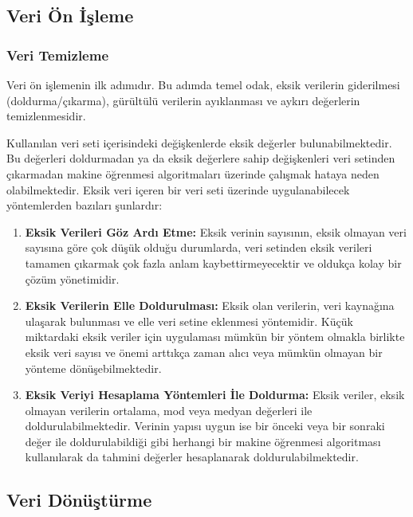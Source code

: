 \documentclass[12pt,twoside]{deuthesis}
\providecommand{\tightlist}{%
  \setlength{\itemsep}{0pt}\setlength{\parskip}{0pt}}
\begin{document}
\hypertarget{veri-uxf6n-iux307ux15fleme}{%
\subsection{Veri Ön İşleme}\label{veri-uxf6n-iux307ux15fleme}}

\hypertarget{veri-temizleme}{%
\subsubsection{Veri Temizleme}\label{veri-temizleme}}

Veri ön işlemenin ilk adımıdır. Bu adımda temel odak, eksik verilerin giderilmesi (doldurma/çıkarma), gürültülü verilerin ayıklanması ve aykırı değerlerin temizlenmesidir.

Kullanılan veri seti içerisindeki değişkenlerde eksik değerler bulunabilmektedir. Bu değerleri doldurmadan ya da eksik değerlere sahip değişkenleri veri setinden çıkarmadan makine öğrenmesi algoritmaları üzerinde çalışmak hataya neden olabilmektedir. Eksik veri içeren bir veri seti üzerinde uygulanabilecek yöntemlerden bazıları şunlardır:
\begin{enumerate}
\def\labelenumi{\arabic{enumi}.}
\tightlist
\item
  \textbf{Eksik Verileri Göz Ardı Etme:} Eksik verinin sayısının, eksik olmayan veri sayısına göre çok düşük olduğu durumlarda, veri setinden eksik verileri tamamen çıkarmak çok fazla anlam kaybettirmeyecektir ve oldukça kolay bir çözüm yönetimidir.
\item
  \textbf{Eksik Verilerin Elle Doldurulması:} Eksik olan verilerin, veri kaynağına ulaşarak bulunması ve elle veri setine eklenmesi yöntemidir. Küçük miktardaki eksik veriler için uygulaması mümkün bir yöntem olmakla birlikte eksik veri sayısı ve önemi arttıkça zaman alıcı veya mümkün olmayan bir yönteme dönüşebilmektedir.
\item
  \textbf{Eksik Veriyi Hesaplama Yöntemleri İle Doldurma:} Eksik veriler, eksik olmayan verilerin ortalama, mod veya medyan değerleri ile doldurulabilmektedir. Verinin yapısı uygun ise bir önceki veya bir sonraki değer ile doldurulabildiği gibi herhangi bir makine öğrenmesi algoritması kullanılarak da tahmini değerler hesaplanarak doldurulabilmektedir.
\end{enumerate}
\hypertarget{veri-duxf6nuxfcux15ftuxfcrme}{%
\subsection{Veri Dönüştürme}\label{veri-duxf6nuxfcux15ftuxfcrme}}
\end{document}
